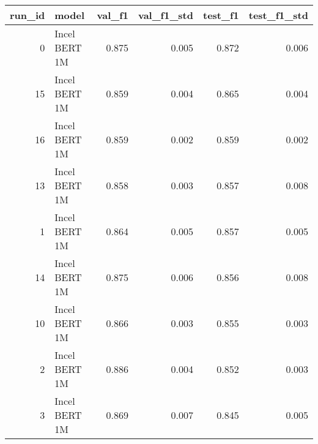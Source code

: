 \begin{tabular}{rlrrrr}
\toprule
 run\_id &         model &  val\_f1 &  val\_f1\_std &  test\_f1 &  test\_f1\_std \\
\midrule
      0 & Incel BERT 1M &   0.875 &       0.005 &    0.872 &        0.006 \\
     15 & Incel BERT 1M &   0.859 &       0.004 &    0.865 &        0.004 \\
     16 & Incel BERT 1M &   0.859 &       0.002 &    0.859 &        0.002 \\
     13 & Incel BERT 1M &   0.858 &       0.003 &    0.857 &        0.008 \\
      1 & Incel BERT 1M &   0.864 &       0.005 &    0.857 &        0.005 \\
     14 & Incel BERT 1M &   0.875 &       0.006 &    0.856 &        0.008 \\
     10 & Incel BERT 1M &   0.866 &       0.003 &    0.855 &        0.003 \\
      2 & Incel BERT 1M &   0.886 &       0.004 &    0.852 &        0.003 \\
      3 & Incel BERT 1M &   0.869 &       0.007 &    0.845 &        0.005 \\
\bottomrule
\end{tabular}

